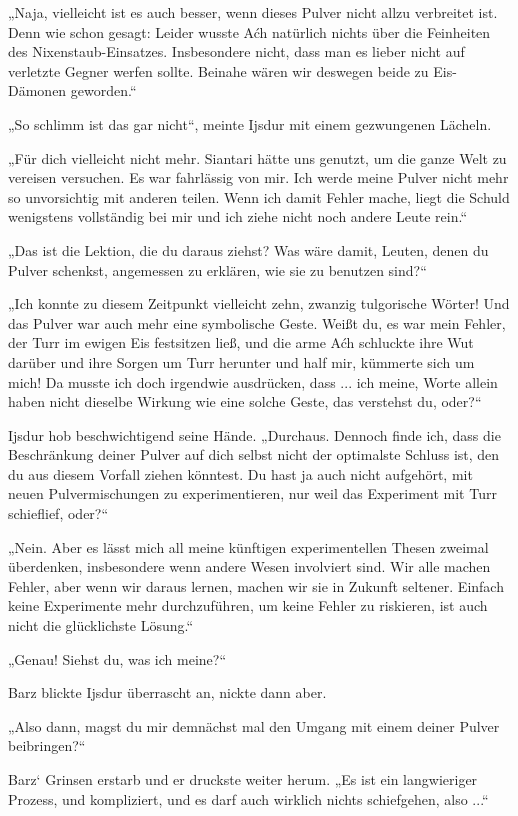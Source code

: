 „Naja, vielleicht ist es auch besser, wenn dieses Pulver nicht allzu verbreitet ist. Denn wie schon gesagt: Leider wusste Aćh natürlich nichts über die Feinheiten des Nixenstaub-Einsatzes. Insbesondere nicht, dass man es lieber nicht auf verletzte Gegner werfen sollte. Beinahe wären wir deswegen beide zu Eis-Dämonen geworden.“

„So schlimm ist das gar nicht“, meinte Ijsdur mit einem gezwungenen Lächeln.

„Für dich vielleicht nicht mehr. Siantari hätte uns genutzt, um die ganze Welt zu vereisen versuchen. Es war fahrlässig von mir. Ich werde meine Pulver nicht mehr so unvorsichtig mit anderen teilen. Wenn ich damit Fehler mache, liegt die Schuld wenigstens vollständig bei mir und ich ziehe nicht noch andere Leute rein.“

„Das ist die Lektion, die du daraus ziehst? Was wäre damit, Leuten, denen du Pulver schenkst, angemessen zu erklären, wie sie zu benutzen sind?“

„Ich konnte zu diesem Zeitpunkt vielleicht zehn, zwanzig tulgorische Wörter! Und das Pulver war auch mehr eine symbolische Geste. Weißt du, es war mein Fehler, der Turr im ewigen Eis festsitzen ließ, und die arme Aćh schluckte ihre Wut darüber und ihre Sorgen um Turr herunter und half mir, kümmerte sich um mich! Da musste ich doch irgendwie ausdrücken, dass ... ich meine, Worte allein haben nicht dieselbe Wirkung wie eine solche Geste, das verstehst du, oder?“

Ijsdur hob beschwichtigend seine Hände. „Durchaus. Dennoch finde ich, dass die Beschränkung deiner Pulver auf dich selbst nicht der optimalste Schluss ist, den du aus diesem Vorfall ziehen könntest. Du hast ja auch nicht aufgehört, mit neuen Pulvermischungen zu experimentieren, nur weil das Experiment mit Turr schieflief, oder?“

„Nein. Aber es lässt mich all meine künftigen experimentellen Thesen zweimal überdenken, insbesondere wenn andere Wesen involviert sind. Wir alle machen Fehler, aber wenn wir daraus lernen, machen wir sie in Zukunft seltener. Einfach keine Experimente mehr durchzuführen, um keine Fehler zu riskieren, ist auch nicht die glücklichste Lösung.“

„Genau! Siehst du, was ich meine?“

Barz blickte Ijsdur überrascht an, nickte dann aber.

„Also dann, magst du mir demnächst mal den Umgang mit einem deiner Pulver beibringen?“

Barz‘ Grinsen erstarb und er druckste weiter herum. „Es ist ein langwieriger Prozess, und kompliziert, und es darf auch wirklich nichts schiefgehen, also ...“

